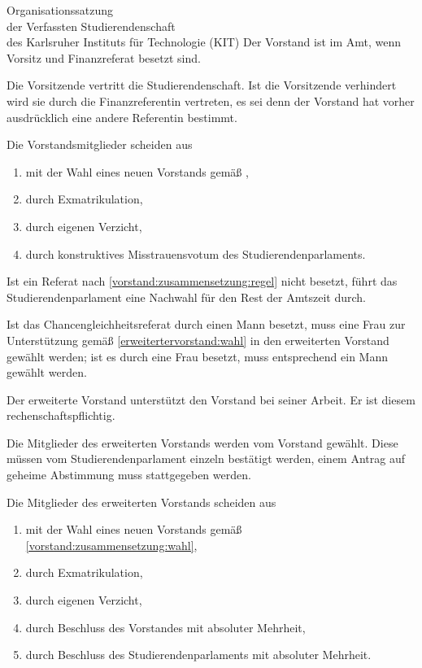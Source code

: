 \begin{jurdoc}[Organisationssatzung]{Organisationssatzung\\der Verfassten Studierendenschaft\\des Karlsruher Instituts für Technologie (KIT)}
Der Vorstand ist im Amt, wenn Vorsitz und Finanzreferat besetzt sind.

Die Vorsitzende vertritt die Studierendenschaft. Ist die Vorsitzende  verhindert wird sie durch die Finanzreferentin vertreten, es sei denn der Vorstand hat vorher ausdrücklich eine andere Referentin bestimmt.

Die Vorstandsmitglieder scheiden aus
  \begin{enumerate}
  \item mit der Wahl eines neuen Vorstands gemäß ,
  \item durch Exmatrikulation,
  \item durch eigenen Verzicht,
  \item durch konstruktives Misstrauensvotum des Studierendenparlaments.
  \end{enumerate}
    Ist ein Referat nach \ref{vorstand:zusammensetzung:regel} nicht besetzt, führt das Studierendenparlament eine Nachwahl für den Rest der Amtszeit durch.

Ist das Chancengleichheitsreferat durch einen Mann besetzt, muss eine Frau zur Unterstützung gemäß \ref{erweitertervorstand:wahl} in den erweiterten Vorstand gewählt werden; ist es durch eine Frau besetzt, muss entsprechend ein Mann gewählt werden.


%
%


\label{erweitertervorstand:aufgaben}
Der erweiterte Vorstand unterstützt den Vorstand bei seiner Arbeit. Er ist diesem rechenschaftspflichtig.

 \label{erweitertervorstand:wahl}

Die Mitglieder des erweiterten Vorstands werden vom Vorstand gewählt. Diese müssen vom Studierendenparlament einzeln bestätigt werden, einem Antrag auf geheime Abstimmung muss stattgegeben werden.

Die Mitglieder des erweiterten Vorstands scheiden aus
\begin{enumerate}
  \item mit der Wahl eines neuen Vorstands gemäß \ref{vorstand:zusammensetzung:wahl},
  \item durch Exmatrikulation,
  \item durch eigenen Verzicht,
  \item durch Beschluss des Vorstandes mit absoluter Mehrheit,
  \item durch Beschluss des Studierendenparlaments mit absoluter Mehrheit.
\end{enumerate}



\end{jurdoc}
